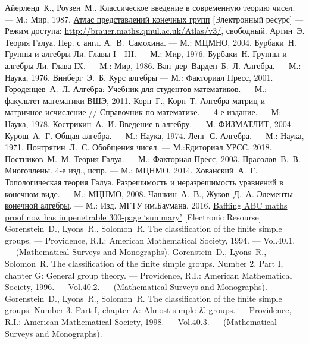 \begin{thebibliography}{199}
 Айерленд~К., Роузен~М.. Классическое введение в современную теорию чисел. --- М.: Мир, 1987.
 \href{http://brauer.maths.qmul.ac.uk/Atlas/v3/}{Атлас представлений конечных групп} [Электронный ресурс] --- Режим доступа: \href{http://brauer.maths.qmul.ac.uk/Atlas/v3/}{http://brauer.maths.qmul.ac.uk/Atlas/v3/}, свободный.
 Артин~Э. Теория Галуа. Пер. с англ. А.~В.~Самохина. --- М.: МЦМНО, 2004.
 Бурбаки~Н. Группы и алгебры Ли. Главы I—III. --- М.: Мир, 1976.
 Бурбаки~Н. Группы и алгебры Ли. Глава IX. --- М.: Мир, 1986.
 Ван~дер~Варден~Б.~Л. Алгебра. --- М.: Наука, 1976.
 Винберг~Э.~Б. Курс алгебры --- М.: Факториал Пресс, 2001.
 Городенцев~А.~Л. Алгебра: Учебник для студентов-математиков. --- М.: факультет математики ВШЭ, 2011.
 Корн~Г., Корн~Т. Алгебра матриц и матричное исчисление // Справочник по математике. --- 4-е издание. --- М: Наука, 1978.
 Кострикин~А.~И. Введение в алгебру. --- М. ФИЗМАТЛИТ, 2004.
 Курош~А.~Г. Общая алгебра. --- М.: Наука, 1974.
 Ленг~С. Алгебра. --- М.: Наука, 1971.
 Понтрягин~Л.~С. Обобщения чисел. --- М.:Едиториал УРСС, 2018.
 Постников~М.~М. Теория Галуа. --- М.: Факториал Пресс, 2003.
 Прасолов~В.~В. Многочлены. 4-е изд., испр. --- М.: МЦНМО, 2014.
 Хованский~А.~Г. Топологическая теория Галуа. Разрешимость и неразрешимость уравнений в конечном виде. --- М.: МЦНМО, 2008.
 Чашкин~А.~В., Жуков~Д.~А. \href{http://ebooks.bmstu.press/catalog/117/book1467.html}{Элементы конечной алгебры}. --- М.: Изд. МГТУ им.Баумана, 2016.
 \href{https://www.newscientist.com/article/2146647-baffling-abc-maths-proof-now-has-impenetrable-300-page-summary/}{Baffling ABC maths proof now has impenetrable 300-page ‘summary’} [Electronic Resourse]
 Gorenstein~D., Lyons~R., Solomon~R. The classification of the finite simple groups. --- Providence, R.I.: American Mathematical Society, 1994. --- Vol.40.1. --- (Mathematical Surveys and Monographs).
 Gorenstein~D., Lyons~R., Solomon~R. The classification of the finite simple groups. Number 2. Part I, chapter G: General group theory. --- Providence, R.I.: American Mathematical Society, 1996. --- Vol.40.2. --- (Mathematical Surveys and Monographs).
 Gorenstein~D., Lyons~R., Solomon~R. The classification of the finite simple groups. Number 3. Part I, chapter A: Almost simple $\cal K$-groups. --- Providence, R.I.: American Mathematical Society, 1998. --- Vol.40.3. --- (Mathematical Surveys and Monographs).

\end{thebibliography}
